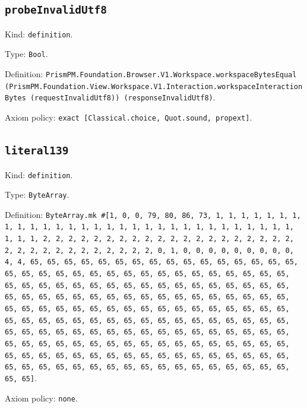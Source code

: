 \documentclass[11pt]{article}
\begin{document}
\subsection*{\texttt{probeInvalidUtf8}}
\noindent Kind: \texttt{definition}.\par
\noindent Type: \texttt{Bool}.\par
\noindent Definition: \texttt{PrismPM.Foundation.Browser.V1.Workspace.workspaceBytesEqual (PrismPM.Foundation.View.Workspace.V1.Interaction.workspaceInteractionBytes (requestInvalidUtf8)) (responseInvalidUtf8)}.\par
\noindent Axiom policy: \texttt{exact [Classical.choice, Quot.sound, propext]}.\par
\subsection*{\texttt{literal139}}
\noindent Kind: \texttt{definition}.\par
\noindent Type: \texttt{ByteArray}.\par
\noindent Definition: \texttt{ByteArray.mk \#[1, 0, 0, 79, 80, 86, 73, 1, 1, 1, 1, 1, 1, 1, 1, 1, 1, 1, 1, 1, 1, 1, 1, 1, 1, 1, 1, 1, 1, 1, 1, 1, 1, 1, 1, 1, 1, 1, 1, 1, 2, 2, 2, 2, 2, 2, 2, 2, 2, 2, 2, 2, 2, 2, 2, 2, 2, 2, 2, 2, 2, 2, 2, 2, 2, 2, 2, 2, 2, 2, 2, 2, 0, 1, 0, 0, 0, 0, 0, 0, 0, 0, 0, 4, 4, 65, 65, 65, 65, 65, 65, 65, 65, 65, 65, 65, 65, 65, 65, 65, 65, 65, 65, 65, 65, 65, 65, 65, 65, 65, 65, 65, 65, 65, 65, 65, 65, 65, 65, 65, 65, 65, 65, 65, 65, 65, 65, 65, 65, 65, 65, 65, 65, 65, 65, 65, 65, 65, 65, 65, 65, 65, 65, 65, 65, 65, 65, 65, 65, 65, 65, 65, 65, 65, 65, 65, 65, 65, 65, 65, 65, 65, 65, 65, 65, 65, 65, 65, 65, 65, 65, 65, 65, 65, 65, 65, 65, 65, 65, 65, 65, 65, 65, 65, 65, 65, 65, 65, 65, 65, 65, 65, 65, 65, 65, 65, 65, 65, 65, 65, 65, 65, 65, 65, 65, 65, 65, 65, 65, 65, 65, 65, 65, 65, 65, 65, 65, 65, 65, 65, 65, 65, 65, 65, 65, 65, 65, 65, 65, 65, 65, 65, 65, 65, 65, 65, 65, 65, 65, 65, 65, 65, 65, 65, 65, 65, 65, 65, 65, 65, 65, 65, 65, 65, 65, 65]}.\par
\noindent Axiom policy: \texttt{none}.\par
\end{document}
